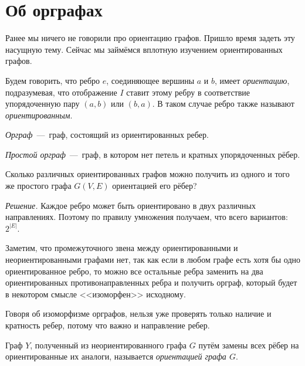 \section{Об орграфах}

	Ранее мы ничего не говорили про ориентацию графов. Пришло время задеть эту насущную тему. 
	Сейчас мы займёмся вплотную изучением ориентированных графов.
	
	
\begin{definition}
	Будем говорить, что ребро $e$, соединяющее вершины $a$ и $b$, имеет \emph{ориентацию}, подразумевая, 
	что отображение $I$ ставит этому ребру в соответствие упорядоченную пару $(a, b)$ или $(b, a)$. 
	В таком случае ребро также называют \emph{ориентированным}.
\end{definition}

\begin{definition}
	\emph{Орграф}~---~граф, состоящий из ориентированных ребер.
\end{definition}

\begin{definition}
	\emph{Простой орграф}~---~граф, в котором нет петель и кратных упорядоченных рёбер.
\end{definition}

\begin{example}
	Сколько различных ориентированных графов можно получить из одного и того же простого графа $G(V, E)$ ориентацией его рёбер?
	
	\emph{Решение.} Каждое ребро может быть ориентировано в двух различных направлениях. 
	Поэтому по правилу умножения получаем, что всего вариантов: $2^{|E|}$.
\end{example}


	Заметим, что промежуточного звена между ориентированными и неориентированными графами нет, так как если 
	в любом графе есть хотя бы одно ориентированное ребро, то можно все остальные ребра заменить на два 
	ориентированных противонаправленных ребра и получить орграф, который будет в некотором смысле <<изоморфен>> исходному.
	
	Говоря об изоморфизме орграфов, нельзя уже проверять только наличие и кратность ребер, потому что важно и направление ребер.

\begin{definition}
	Граф $Y$, полученный из неориентированного графа $G$ путём замены всех рёбер на ориентированные их аналоги, 
	называется \emph{ориентацией графа $G$}.
\end{definition}	

